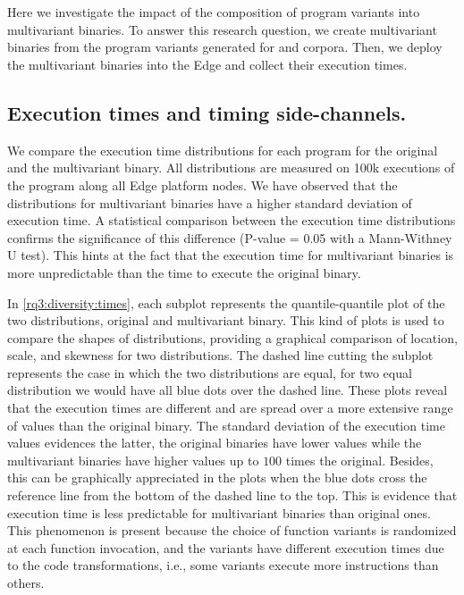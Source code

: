 \section{\rqthree}
\label{results:rq3}

Here we investigate the impact of the composition of program variants into multivariant binaries.
To answer this research question, we create multivariant binaries from the program variants generated for \corpussodium and \corpusqrcode corpora. Then, we deploy the multivariant binaries into the Edge and collect their execution times. 

\subsection*{Execution times and timing side-channels.}


We compare the execution time distributions for each program for the original and the multivariant binary. All distributions are measured on 100k executions of the program along all Edge platform nodes.
We have observed that the distributions for multivariant binaries have a higher standard deviation of execution time.
A statistical comparison between the execution time distributions confirms the significance of this difference (P-value = 0.05 with a  Mann-Withney U test). This hints at the fact that the execution time for multivariant binaries is more unpredictable than the time to execute the original binary. 


In \autoref{rq3:diversity:times}, each subplot represents the quantile-quantile plot \cite{gnanadesikan1968probability} of the two distributions, original and multivariant binary.
This kind of plots is used to compare the shapes of distributions, providing a graphical comparison of location, scale, and skewness for two distributions.
The dashed line cutting the subplot represents the case in which the two distributions are equal, \ie for two equal distribution we would have all blue dots over the dashed line. These plots reveal that the execution times are different and are spread over a more extensive range of values than the original binary.
The standard deviation of the execution time values evidences the latter, the original binaries have lower values while the multivariant binaries have higher values up to $100$ times the original. Besides, this can be graphically appreciated in the plots when the blue dots cross the reference line from the bottom of the dashed line to the top.
This is evidence that execution time is less predictable for multivariant binaries than original ones.
This phenomenon is present because the choice of function variants is randomized at each function invocation, and the variants have different execution times due to the code transformations, i.e., some variants execute more instructions than others. 
 

